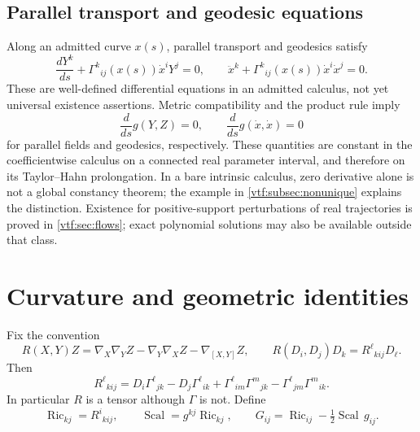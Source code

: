 \documentclass[11pt,letterpaper]{article}
\theoremstyle{definition}
\theoremstyle{remark}
\newcommand{\Ric}{\operatorname{Ric}}\newcommand{\Scal}{\operatorname{Scal}}
\begin{document}
\subsection{Parallel transport and geodesic equations}

Along an admitted curve $x(s)$, parallel transport and geodesics satisfy
\[
 \frac{dY^k}{ds}+\Gamma^k{}_{ij}(x(s))\dot x^iY^j=0,
 \qquad
 \ddot x^k+\Gamma^k{}_{ij}(x(s))\dot x^i\dot x^j=0.
\]
These are well-defined differential equations in an admitted calculus, not
yet universal existence assertions. Metric compatibility and the product
rule imply
\[
 \frac{d}{ds}g(Y,Z)=0,\qquad
 \frac{d}{ds}g(\dot x,\dot x)=0
\]
for parallel fields and geodesics, respectively. These quantities are constant
in the coefficientwise calculus on a connected real parameter interval, and
therefore on its Taylor--Hahn prolongation. In a bare intrinsic calculus,
zero derivative alone is not a global constancy theorem; the example in
\cref{vtf:subsec:nonunique} explains the distinction. Existence for positive-support
perturbations of real trajectories is proved in \cref{vtf:sec:flows}; exact
polynomial solutions may also be available outside that class.

\section{Curvature and geometric identities}\label{vtf:sec:curvature}

Fix the convention
\[
 R(X,Y)Z=\nabla_X\nabla_YZ-\nabla_Y\nabla_XZ-\nabla_{[X,Y]}Z,
 \qquad R(D_i,D_j)D_k=R^\ell{}_{kij}D_\ell.
\]
Then
\begin{equation}\label{vtf:eq:curvature}
 R^\ell{}_{kij}=D_i\Gamma^\ell{}_{jk}-D_j\Gamma^\ell{}_{ik}
 +\Gamma^\ell{}_{im}\Gamma^m{}_{jk}
 -\Gamma^\ell{}_{jm}\Gamma^m{}_{ik}.
\end{equation}
In particular $R$ is a tensor although $\Gamma$ is not. Define
\[
 \Ric_{kj}=R^i{}_{kij},\qquad \Scal=g^{kj}\Ric_{kj},\qquad
 G_{ij}=\Ric_{ij}-\tfrac12\Scal\,g_{ij}.
\]
\end{document}
